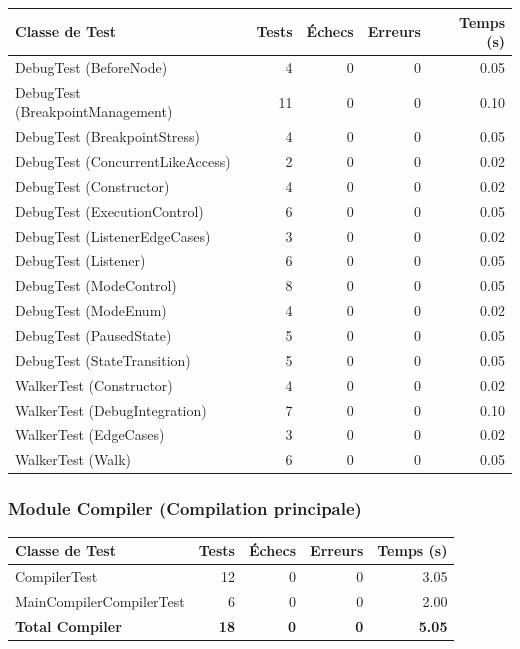 \begin{center}
\small
\begin{tabular}{|l|r|r|r|r|}
\hline
\rowcolor{headerblue!20}
\textbf{Classe de Test} & \textbf{Tests} & \textbf{Échecs} & \textbf{Erreurs} & \textbf{Temps (s)} \\
\hline
DebugTest (BeforeNode) & 4 & 0 & 0 & 0.05 \\
\hline
DebugTest (BreakpointManagement) & 11 & 0 & 0 & 0.10 \\
\hline
DebugTest (BreakpointStress) & 4 & 0 & 0 & 0.05 \\
\hline
DebugTest (ConcurrentLikeAccess) & 2 & 0 & 0 & 0.02 \\
\hline
DebugTest (Constructor) & 4 & 0 & 0 & 0.02 \\
\hline
DebugTest (ExecutionControl) & 6 & 0 & 0 & 0.05 \\
\hline
DebugTest (ListenerEdgeCases) & 3 & 0 & 0 & 0.02 \\
\hline
DebugTest (Listener) & 6 & 0 & 0 & 0.05 \\
\hline
DebugTest (ModeControl) & 8 & 0 & 0 & 0.05 \\
\hline
DebugTest (ModeEnum) & 4 & 0 & 0 & 0.02 \\
\hline
DebugTest (PausedState) & 5 & 0 & 0 & 0.05 \\
\hline
DebugTest (StateTransition) & 5 & 0 & 0 & 0.05 \\
\hline
WalkerTest (Constructor) & 4 & 0 & 0 & 0.02 \\
\hline
WalkerTest (DebugIntegration) & 7 & 0 & 0 & 0.10 \\
\hline
WalkerTest (EdgeCases) & 3 & 0 & 0 & 0.02 \\
\hline
WalkerTest (Walk) & 6 & 0 & 0 & 0.05 \\
\hline
\end{tabular}
\end{center}

\subsubsection{Module Compiler (Compilation principale)}

\begin{center}
\small
\begin{tabular}{|l|r|r|r|r|}
\hline
\rowcolor{headerblue!20}
\textbf{Classe de Test} & \textbf{Tests} & \textbf{Échecs} & \textbf{Erreurs} & \textbf{Temps (s)} \\
\hline
CompilerTest & 12 & 0 & 0 & 3.05 \\
\hline
MainCompilerCompilerTest & 6 & 0 & 0 & 2.00 \\
\hline
\rowcolor{gray!10}
\textbf{Total Compiler} & \textbf{18} & \textbf{0} & \textbf{0} & \textbf{5.05} \\
\hline
\end{tabular}
\end{center}

